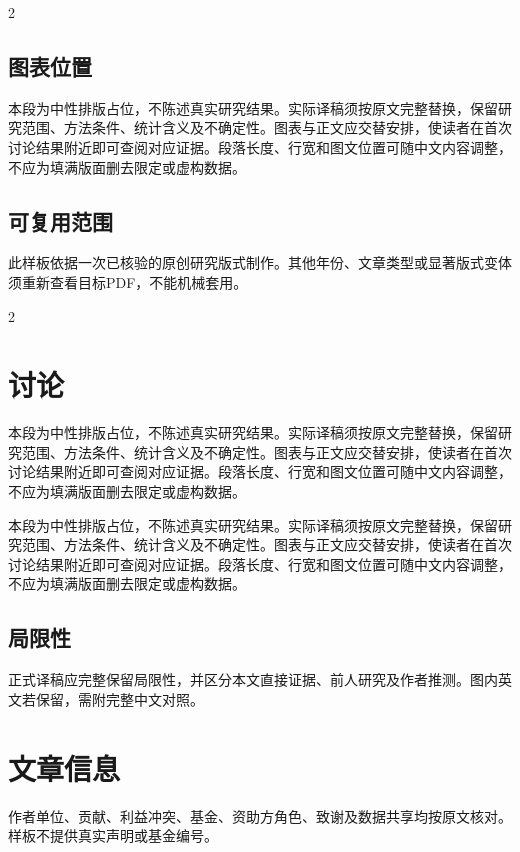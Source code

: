 \documentclass[UTF8,fontset=none]{ctexart}
\newcommand{\neutralpara}{本段为中性排版占位，不陈述真实研究结果。实际译稿须按原文完整替换，保留研究范围、方法条件、统计含义及不确定性。图表与正文应交替安排，使读者在首次讨论结果附近即可查阅对应证据。段落长度、行宽和图文位置可随中文内容调整，不应为填满版面删去限定或虚构数据。}
\begin{document}
\begin{multicols}{2}\fontsize{8.8bp}{11.6bp}\selectfont\subsection*{图表位置}\neutralpara\par\subsection*{可复用范围}此样板依据一次已核验的原创研究版式制作。其他年份、文章类型或显著版式变体须重新查看目标PDF，不能机械套用。
\end{multicols}
\clearpage
\noindent\begin{minipage}[t]{347bp}\vspace{0pt}\DemoVector\end{minipage}\hfill\begin{minipage}[t]{108bp}\vspace{0pt}\sffamily\fontsize{7.6bp}{9.2bp}\selectfont\DemoCaption\end{minipage}\par\vspace{12bp}
\begin{multicols}{2}\fontsize{8.8bp}{11.6bp}\selectfont\section*{讨论}\neutralpara\par\neutralpara
\subsection*{局限性}正式译稿应完整保留局限性，并区分本文直接证据、前人研究及作者推测。图内英文若保留，需附完整中文对照。
\section*{文章信息}作者单位、贡献、利益冲突、基金、资助方角色、致谢及数据共享均按原文核对。样板不提供真实声明或基金编号。
\SampleBibliography
\SampleSourceInfo
\end{multicols}
\end{document}
